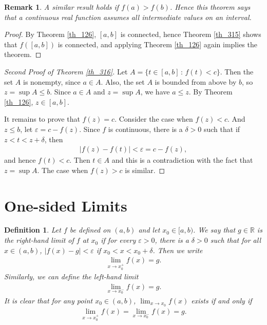 \documentclass[11pt]{book}
\newtheorem{definition}{Definition}[chapter]
\newtheorem{remark}{Remark}[chapter]
\theoremstyle{definition}
\numberwithin{equation}{chapter}
\begin{document}
\begin{remark}
A similar result holds if $f(a) > f(b)$. Hence this theorem says that a continuous real function assumes all intermediate values on an interval.
\end{remark}

\begin{proof}
By Theorem \ref{th_126}, $[a,b]$ is connected, hence Theorem \ref{th_315} shows that $f([a,b])$ is connected, and applying Theorem \ref{th_126} again implies the theorem.
\end{proof}

\medskip

\begin{proof}[Second Proof of Theorem \ref{th_316}]
Let $A = \{t \in [a,b] \,:\, f(t) < c\}$. Then the set $A$ is nonempty, since $a \in A$. Also, the set $A$ is bounded from above by $b$, so $z = \sup A \leq b$. Since $a \in A$ and $z = \sup A$, we have $a \leq z$. By Theorem \ref{th_126}, $z \in [a,b]$.

It remains to prove that $f(z) = c$. Consider the case when $f(z) < c$. And $z \leq b$, let $\varepsilon = c - f(z)$. Since $f$ is continuous, there is a $\delta > 0$ such that if $z < t < z + \delta$, then
\begin{align*}
    \left|f(z) - f(t)\right| < \varepsilon = c - f(z),
\end{align*}
and hence $f(t) < c$. Then $t \in A$ and this is a contradiction with the fact that $z = \sup A$. The case when $f(z) > c$ is similar.
\end{proof}

\medskip






\section{One-sided Limits}


\begin{definition}
Let $f$ be defined on $(a,b)$ and let $x_0 \in [a,b)$. We say that $g \in \mathbb{R}$ is the right-hand limit of $f$ at $x_0$ if for every $\varepsilon > 0$, there is a $\delta > 0$ such that for all $x \in (a,b)$, $\left|f(x) - g\right| < \varepsilon$ if $x_0 < x < x_0 + \delta$. Then we write
\begin{align*}
    \lim_{x \to x_0^+} f(x) = g.
\end{align*}
Similarly, we can define the left-hand limit
\begin{align*}
    \lim_{x \to x_0^-} f(x) = g.
\end{align*}
It is clear that for any point $x_0 \in (a,b)$, $\lim_{x \to x_0}f(x)$ exists if and only if 
\begin{align*}
    \lim_{x \to x_0^+} f(x) = \lim_{x \to x_0^-} f(x) = g.
\end{align*}
\end{definition}
\end{document}
